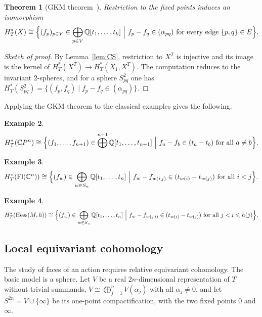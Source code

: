 \documentclass[11pt,a4paper]{article}
\numberwithin{equation}{section}
\theoremstyle{plain}
\newtheorem{theorem}{Theorem}[section]
\theoremstyle{definition}
\newtheorem{example}[theorem]{Example}
\theoremstyle{remark}
\newcommand{\Q}{\mathbb{Q}}
\newcommand{\C}{\mathbb{C}}
\newcommand{\HT}{H^{*}_{T}}
\DeclareMathOperator{\Fl}{Fl}
\DeclareMathOperator{\Hess}{Hess}
\begin{document}
\begin{theorem}[GKM theorem~\cite{GKM98}]\label{thm:GKM}
Restriction to the fixed points induces an isomorphism
\[
\HT(X)\cong\Bigl\{(f_p)_{p\in V}\in\bigoplus_{p\in V}\Q[t_1,\dots,t_k]\ \Big|\ f_p-f_q\in(\alpha_{pq})\text{ for every edge }\{p,q\}\in E\Bigr\}.
\]
\end{theorem}
\begin{proof}[Sketch of proof]
By Lemma~\ref{lem:CS}, restriction to $X^T$ is injective and its image is the kernel of $\HT(X^T)\to\HT(X_1,X^T)$. The computation reduces to the invariant $2$-spheres, and for a sphere $S^2_{pq}$ one has $\HT(S^2_{pq})=\{(f_p,f_q)\mid f_p-f_q\in(\alpha_{pq})\}$.
\end{proof}

Applying the GKM theorem to the classical examples gives the following.

\begin{example}
\[
\HT(\C P^n)\cong\Bigl\{(f_1,\dots,f_{n+1})\in\bigoplus^{n+1}\Q[t_1,\dots,t_{n+1}]\ \Big|\ f_a-f_b\in(t_a-t_b)\text{ for all }a\neq b\Bigr\}.
\]
\end{example}

\begin{example}
\[
\HT(\Fl(\C^n))\cong\Bigl\{(f_w)\in\bigoplus_{w\in S_n}\Q[t_1,\dots,t_n]\ \Big|\ f_w-f_{w(i\,j)}\in(t_{w(i)}-t_{w(j)})\text{ for all }i<j\Bigr\}.
\]
\end{example}

\begin{example}\label{ex:hess-ring}
\[
\HT(\Hess(M,h))\cong\Bigl\{(f_w)\in\bigoplus_{w\in S_n}\Q[t_1,\dots,t_n]\ \Big|\ f_w-f_{w(j\,i)}\in(t_{w(i)}-t_{w(j)})\text{ for all }j<i\leqslant h(j)\Bigr\}.
\]
\end{example}

\subsection{Local equivariant cohomology}\label{sec:local}

The study of faces of an action requires relative equivariant cohomology. The basic model is a sphere. Let $V$ be a real $2n$-dimensional representation of $T$ without trivial summands, $V\cong\bigoplus_{j=1}^nV(\alpha_j)$ with all $\alpha_j\neq0$, and let $S^{2n}=V\cup\{\infty\}$ be its one-point compactification, with the two fixed points $0$ and $\infty$.
\end{document}
